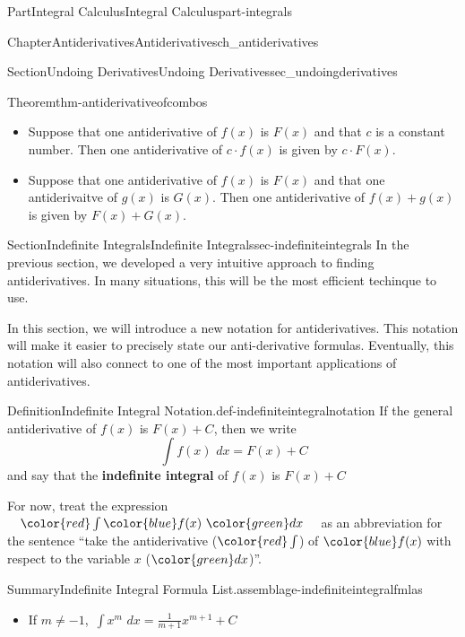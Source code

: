 \documentclass[oneside,10pt,]{tufte-book}
\newcommand{\terminology}[1]{\textbf{#1}}
\numberwithin{equation}{chapter}
\newcommand{\red}[1]{   {\color{red}   #1}   }
\newcommand{\blue}[1]{  {\color{blue}  #1}  }
\newcommand{\green}[1]{ {\color{green} #1} }
\newcommand{\intdx}[1]{{\,\int#1\,\,dx}}
\begin{document}
\begin{partptx}{Part}{Integral Calculus}{}{Integral Calculus}{}{}{part-integrals}
\begin{chapterptx}{Chapter}{Antiderivatives}{}{Antiderivatives}{}{}{ch_antiderivatives}
\begin{sectionptx}{Section}{Undoing Derivatives}{}{Undoing Derivatives}{}{}{sec_undoingderivatives}
\begin{theorem}{Theorem}{}{}{thm-antiderivativeofcombos}%
%
\begin{itemize}[label=\textbullet]
\item{}Suppose that one antiderivative of \(f(x)\) is \(F(x)\) and that \(c\) is a constant number. Then one antiderivative of \(c\cdot f(x)\) is given by  \(c\cdot F(x)\).%
\item{}Suppose that one antiderivative of \(f(x)\) is \(F(x)\) and that one antiderivaitve of \(g(x)\) is \(G(x)\). Then one antiderivative of \(f(x)+g(x)\) is given by \(F(x) + G(x)\).%
\end{itemize}
%
\end{theorem}
\end{sectionptx}
%
%
\typeout{************************************************}
\typeout{************************************************}
%
\begin{sectionptx}{Section}{Indefinite Integrals}{}{Indefinite Integrals}{}{}{sec-indefiniteintegrals}
In the previous section, we developed a very intuitive approach to finding antiderivatives. In many situations, this will be the most efficient techinque to use.%
\par
In this section, we will introduce a new notation for antiderivatives. This notation will make it easier to precisely state our anti-derivative formulas. Eventually, this notation will also connect to one of the most important applications of antiderivatives.%
\begin{definition}{Definition}{Indefinite Integral Notation.}{def-indefiniteintegralnotation}%
If the general antiderivative of \(f(x)\) is \(F(x) + C\), then we write%
\begin{equation*}
\intdx{ f(x) } = F(x) + C
\end{equation*}
and say that the \terminology{indefinite integral} of \(f(x)\) is \(F(x)+C\)%
\par
For now, treat the expression \(\quad \red{\int}\, \blue{f(x)}\,\,\green{dx}\quad\) as an abbreviation for the sentence ``take the antiderivative (\(\red{\int}\)) of \(\blue{f(x)}\)  with respect to the variable \(x\) (\(\green{dx}\))''.%
\end{definition}
\begin{assemblage}{Summary}{Indefinite Integral Formula List.}{assemblage-indefiniteintegralfmlas}%
%
\begin{itemize}[label=\textbullet]
\item{}If \(m\neq -1\), \(\intdx{ x^m } = \frac{1}{m+1}x^{m+1} + C \)%

\end{itemize}
\end{assemblage}
\end{sectionptx}
\end{chapterptx}
\end{partptx}
\end{document}
